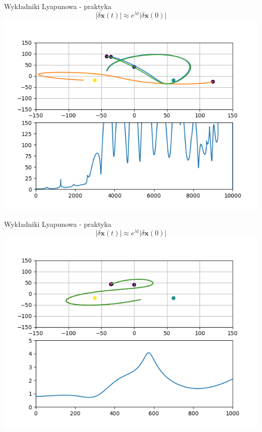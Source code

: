 \documentclass{beamer}
\begin{document}
\begin{frame}[t]{Wykładniki Lyapunowa - praktyka}
\begin{equation*}
| \delta\mathbf{x}(t) | \approx e^{\lambda t} | \delta \mathbf{x}(0) |
\end{equation*}
\centering
\includegraphics[height=0.7\textheight]{lyapunov}
\end{frame}

\begin{frame}[t]{Wykładniki Lyapunowa - praktyka}
\begin{equation*}
| \delta\mathbf{x}(t) | \approx e^{\lambda t} | \delta \mathbf{x}(0) |
\end{equation*}
\centering
\includegraphics[height=0.7\textheight]{lyapunov_short}
\end{frame}
\end{document}
